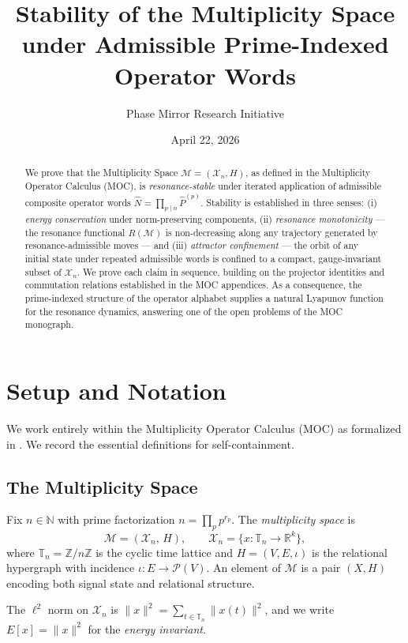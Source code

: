 \documentclass[11pt]{amsart}
\title{Stability of the Multiplicity Space under Admissible Prime-Indexed Operator Words}
\author{Phase Mirror Research Initiative}
\date{April 22, 2026}
\newcommand{\M}{\mathcal{M}}
\newcommand{\X}{\mathcal{X}}
\newcommand{\bN}{\widehat{N}}
\newcommand{\R}{\mathbb{R}}
\newcommand{\Z}{\mathbb{Z}}
\newcommand{\N}{\mathbb{N}}
\newcommand{\Tn}{\mathbb{T}_n}
\newcommand{\norm}[1]{\lVert #1 \rVert}
\begin{document}
\maketitle

\begin{abstract}
We prove that the Multiplicity Space $\M = (\X_n, H)$, as defined in the Multiplicity Operator Calculus (MOC), is \emph{resonance-stable} under iterated application of admissible composite operator words $\bN = \prod_{p \mid n} \hat{P}^{(p)}$. Stability is established in three senses: (i) \emph{energy conservation} under norm-preserving components, (ii) \emph{resonance monotonicity} — the resonance functional $R(\M)$ is non-decreasing along any trajectory generated by resonance-admissible moves — and (iii) \emph{attractor confinement} — the orbit of any initial state under repeated admissible words is confined to a compact, gauge-invariant subset of $\X_n$. We prove each claim in sequence, building on the projector identities and commutation relations established in the MOC appendices. As a consequence, the prime-indexed structure of the operator alphabet supplies a natural Lyapunov function for the resonance dynamics, answering one of the open problems of the MOC monograph.
\end{abstract}
\newpage
\tableofcontents
\newpage
\section{Setup and Notation}

We work entirely within the Multiplicity Operator Calculus (MOC) as formalized in \cite{MOC2026}. We record the essential definitions for self-containment.

\subsection{The Multiplicity Space}

Fix $n \in \N$ with prime factorization $n = \prod_{p} p^{r_p}$. The \emph{multiplicity space} is
\[
  \M = (\X_n,\, H), \qquad \X_n = \{x : \Tn \to \R^k\},
\]
where $\Tn = \Z/n\Z$ is the cyclic time lattice and $H = (V, E, \iota)$ is the relational hypergraph with incidence $\iota : E \to \mathcal{P}(V)$. An element of $\M$ is a pair $(X, H)$ encoding both signal state and relational structure.

The $\ell^2$ norm on $\X_n$ is $\norm{x}^2 = \sum_{t \in \Tn} \norm{x(t)}^2$, and we write $E[x] = \norm{x}^2$ for the \emph{energy invariant}.
\end{document}
